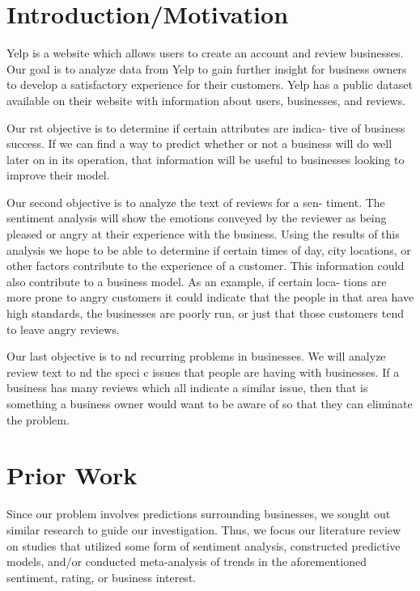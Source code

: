 
\section{Introduction/Motivation}

\quad Yelp is a website which allows users to create an account and review businesses. Our goal is to analyze data from Yelp to gain further insight for business owners to develop a satisfactory experience for their customers. Yelp has a public dataset available on their website with information about users, businesses, and reviews.

\quad Our  rst objective is to determine if certain attributes are indica- tive of business success. If we can find a way to predict whether or not a business will do well later on in its operation, that information will be useful to businesses looking to improve their model.

\quad Our second objective is to analyze the text of reviews for a sen- timent. The sentiment analysis will show the emotions conveyed by the reviewer as being pleased or angry at their experience with the business. Using the results of this analysis we hope to be able to determine if certain times of day, city locations, or other factors contribute to the experience of a customer. This information could also contribute to a business model. As an example, if certain loca- tions are more prone to angry customers it could indicate that the people in that area have high standards, the businesses are poorly run, or just that those customers tend to leave angry reviews.

\quad Our last objective is to  nd recurring problems in businesses. We will analyze review text to  nd the speci c issues that people are having with businesses. If a business has many reviews which all indicate a similar issue, then that is something a business owner would want to be aware of so that they can eliminate the problem.

\section{Prior Work}

Since our problem involves predictions surrounding businesses, we sought out similar research to guide our investigation. Thus, we focus our literature review on studies that utilized some form of sentiment analysis, constructed predictive models, and/or conducted meta-analysis of trends in the aforementioned sentiment, rating, or business interest.

